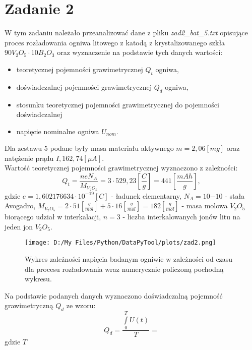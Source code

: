 \documentclass[12pt,a4paper]{article}
\begin{document}
\section*{Zadanie 2}
W tym zadaniu należało przeanalizować dane z pliku \textit{zad2_bat_5.txt} opisujące proces rozładowania ogniwa litowego z katodą z krystalizowanego szkła $90V_2O_5\cdot10B_2O_3$ oraz wyznaczenie na podstawie tych danych wartości:
\begin{itemize}
\item teoretycznej pojemności grawimetrycznej $Q_t$ ogniwa,
\item doświadczalnej pojemności grawimetrycznej $Q_d$ ogniwa,
\item stosunku teoretycznej pojemności grawimetrycznej do pojemności doświadczalnej
\item napięcie nominalne ogniwa $U_{nom}$. 
\end{itemize}
Dla zestawu 5 podane były masa materiału aktywnego $m=2,06[mg]$ oraz natężenie prądu $I,162,74[\mu A]$.
\\
Wartość teoretycznej pojemności grawimetrycznej wyznaczono z zależności:
\begin{equation}
Q_t = \frac{neN_A}{M_{V_2O_5}} = 3\cdot 529,23[\frac{C}{g}] = 441[\frac{mAh}{g}],
\end{equation}
gdzie $e=1,602176634 \cdot 10^{-19}[C]$ - ładunek elementarny, $N_A = 10{-10}$ - stała Avogadro, $M_{V_2O_5} = 2\cdot 51[\frac{g}{mol}] + 5\cdot 16 [\frac{g}{mol}] = 182[\frac{g}{mol}]$ - masa molowa $V_2O_5$ biorącego udział w interkalacji, $n = 3$ - liczba interkalowanych jonów litu na jeden jon $V_2O_5$. 
\begin{figure}[H]
\centering
\texttt{[image: D:/My Files/Python/DataPyTool/plots/zad2.png]}
\vspace{-0,2cm}
\label{Wykres zależności napięcia badanym ogniwie w zależności od czasu dla procesu rozładowania wraz numerycznie policzoną pochodną wykresu.}
\caption{Wykres zależności napięcia badanym ogniwie w zależności od czasu dla procesu rozładowania wraz numerycznie policzoną pochodną wykresu.}
\end{figure}
Na podstawie podanych danych wyznaczono doświadczalną pojemność grawimetryczną $Q_d$ ze wzoru:
\begin{equation}
Q_d = \frac{\int\limits_0^T U(t)}{T} = 
\end{equation}
gdzie $T$
\vspace{2cm}
\noindent
\end{document}
